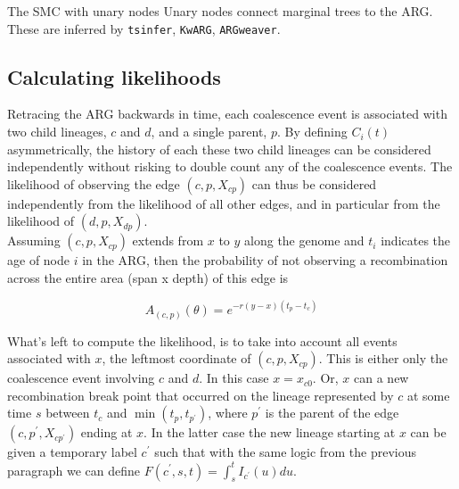 \documentclass{article}
\newcommand{\tsinfer}[0]{\texttt{tsinfer}}
\newcommand{\kwarg}[0]{\texttt{KwARG}}
\newcommand{\argweaver}[0]{\texttt{ARGweaver}}
\begin{document}
The SMC with unary nodes
Unary nodes connect marginal trees to the ARG.
These are inferred by \tsinfer, \kwarg, \argweaver. %




\subsection{Calculating likelihoods} \label{par:liks}

Retracing the ARG backwards in time, each coalescence event is associated with two child 
lineages, $c$ and $d$, and a single parent, $p$. By defining $C_i(t)$ asymmetrically, 
the history of each these two child lineages can be considered independently without 
risking to double count any of the coalescence events. The likelihood of 
observing the edge $(c, p, X_{cp})$ can thus be considered independently from 
the likelihood of all other edges, and in particular from the likelihood 
of $(d, p, X_{dp})$.\\

Assuming $(c, p, X_{cp})$ extends from $x$ to $y$ along the genome and $t_i$ 
indicates the age of 
node $i$ in the ARG, then the probability of not observing a recombination across the 
entire area (span x depth) of this edge is 

\begin{equation}\label{eq:span}
A_{(c, p)}(\theta) = e^{-r (y-x)(t_p - t_{c})}
\end{equation}

What's left to compute the likelihood, is to take into account all events 
associated with $x$, 
the leftmost coordinate of $(c, p, X_{cp})$. This is either only the 
coalescence event involving 
$c$ and $d$. In this case $x=x_{c0}$. Or, $x$ can a new recombination break point that 
occurred on the lineage represented by $c$ at some time $s$ between $t_{c}$ 
and $\min(t_p, t_{p^{\prime}})$, where $p^{\prime}$ is the parent of the 
edge $(c, p^{\prime}, X_{cp^{\prime}})$ ending at $x$.
In the latter case the new lineage starting at $x$ can be given a temporary label 
$c^{\prime}$ such that with the same logic from the previous paragraph we 
can define $F(c^{\prime}, s, t) = \int_{s}^{t} I_{c^{\prime}}(u)du$. 
\end{document}
